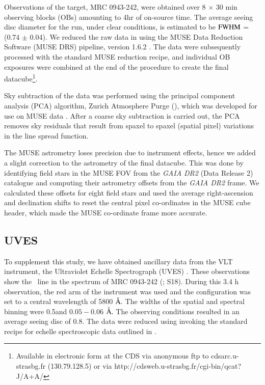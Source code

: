 Observations of the target, MRC 0943-242, were obtained over 8 $\times$ 30 min observing blocks (OBs) amounting to 4hr of on-source time. The average seeing disc diameter for the run, under clear conditions, is estimated to be $\rm FWHM$ = (0.74 $\pm$ 0.04)\arcsec. We reduced the raw data in  using the MUSE Data Reduction Software (MUSE DRS) pipeline, version 1.6.2 \citep{weilbacher2014}. The data were subsequently processed with the standard MUSE reduction recipe, and individual OB exposures were combined at the end of the procedure to create the final datacube\footnote{Available in electronic form at the CDS via anonymous ftp to cdsarc.u-strasbg.fr (130.79.128.5)
or via http://cdsweb.u-strasbg.fr/cgi-bin/qcat?J/A+A/}. 

Sky subtraction of the data was performed using the principal component analysis (PCA) algorithm, Zurich Atmosphere Purge (), which was developed for use on MUSE data \citep{Soto2016}. After a coarse sky subtraction is carried out, the PCA removes sky residuals that result from spaxel to spaxel (spatial pixel) variations in the line spread function.

The MUSE astrometry loses precision due to instrument effects, hence we added a slight correction to the astrometry of the final datacube. This was done by identifying field stars in the MUSE FOV from the {\it GAIA DR2} (Data Release 2) catalogue \citep{gaia2016,gaia2018} and computing their astrometry offsets from the {\it GAIA DR2} frame. We calculated these offsets for eight field stars and used the average right-ascension and declination shifts to reset the central pixel co-ordinates in the MUSE cube header, which made the MUSE co-ordinate frame more accurate.

\subsection{UVES}
To supplement this study, we have obtained ancillary data from the VLT instrument, the Ultraviolet Echelle Spectrograph (UVES) \citep{dodorico2000,dekker2000}. These observations show the \lya~line in the spectrum of MRC 0943-242 (\citealp{jarvis2003,wilman2004}; S18). During this 3.4 h observation, the red arm of the instrument was used and the configuration was set to a central wavelength of 5800 $\mbox{\normalfont\AA }.$ The widths of the spatial and spectral binning were 0.5\arcsec and $0.05-0.06$ $\mbox{\normalfont\AA }.$ The observing conditions resulted in an average seeing disc of 0.8\arcsec. The data were reduced using  invoking the standard recipe for echelle spectroscopic data outlined in \citet{churchill1995}.

